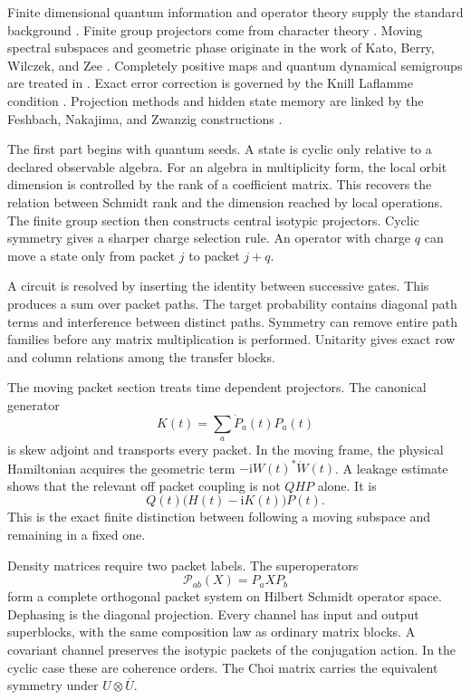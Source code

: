 \documentclass{aomart}
\theoremstyle{definition}
\theoremstyle{remark}
\newcommand{\Pcal}{\mathcal P}
\newcommand{\ii}{\mathrm i}
\begin{document}
Finite dimensional quantum information and operator theory supply the standard background \cite{NielsenChuang2010,Watrous2018,Bhatia1997}. Finite group projectors come from character theory \cite{Serre1977,FultonHarris1991}. Moving spectral subspaces and geometric phase originate in the work of Kato, Berry, Wilczek, and Zee \cite{Kato1950,Kato1995,Berry1984,WilczekZee1984}. Completely positive maps and quantum dynamical semigroups are treated in \cite{Stinespring1955,Choi1975,Kraus1983,Lindblad1976}. Exact error correction is governed by the Knill Laflamme condition \cite{KnillLaflamme1997,SchumacherNielsen1996,BenyKempfKribs2007}. Projection methods and hidden state memory are linked by the Feshbach, Nakajima, and Zwanzig constructions \cite{Feshbach1958,Nakajima1958,Zwanzig1960,BravyiDiVincenzoLoss2011}.

The first part begins with quantum seeds. A state is cyclic only relative to a declared observable algebra. For an algebra in multiplicity form, the local orbit dimension is controlled by the rank of a coefficient matrix. This recovers the relation between Schmidt rank and the dimension reached by local operations. The finite group section then constructs central isotypic projectors. Cyclic symmetry gives a sharper charge selection rule. An operator with charge \(q\) can move a state only from packet \(j\) to packet \(j+q\).

A circuit is resolved by inserting the identity between successive gates. This produces a sum over packet paths. The target probability contains diagonal path terms and interference between distinct paths. Symmetry can remove entire path families before any matrix multiplication is performed. Unitarity gives exact row and column relations among the transfer blocks.

The moving packet section treats time dependent projectors. The canonical generator
\[
K(t)=\sum_a\dot P_a(t)P_a(t)
\]
is skew adjoint and transports every packet. In the moving frame, the physical Hamiltonian acquires the geometric term \(-\ii W(t)^*\dot W(t)\). A leakage estimate shows that the relevant off packet coupling is not \(QHP\) alone. It is
\[
Q(t)\bigl(H(t)-\ii K(t)\bigr)P(t).
\]
This is the exact finite distinction between following a moving subspace and remaining in a fixed one.

Density matrices require two packet labels. The superoperators
\[
\Pcal_{ab}(X)=P_aXP_b
\]
form a complete orthogonal packet system on Hilbert Schmidt operator space. Dephasing is the diagonal projection. Every channel has input and output superblocks, with the same composition law as ordinary matrix blocks. A covariant channel preserves the isotypic packets of the conjugation action. In the cyclic case these are coherence orders. The Choi matrix carries the equivalent symmetry under \(U\otimes\overline U\).
\end{document}
